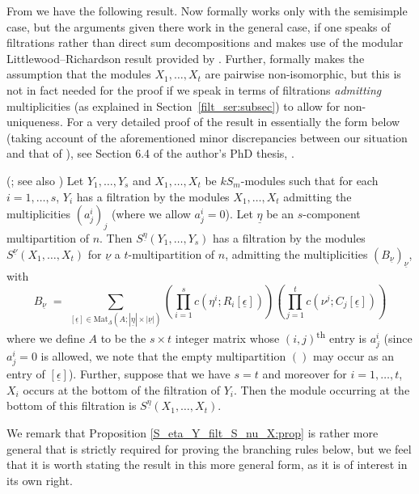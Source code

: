 \documentclass[ALCO,Unicode,published]{cedram}
\newcommand{\tss}[1]{\textsuperscript{#1}}
\newcommand{\ul}[1]{\underline{#1}}
\begin{document}
From \cite{CHTAN} we have the following result. Now \cite{CHTAN} formally works only with the semisimple case, but the arguments given
there work in the general case, if one speaks of filtrations rather than direct sum decompositions and makes use of the  modular
Littlewood--Richardson result provided by \cite{JAMPEEL}. Further, \cite{CHTAN} formally makes the assumption that the modules
$X_1,\ldots,X_t$ are pairwise non-isomorphic, but this is not in fact needed for the proof if we speak in terms of filtrations
\textit{admitting} multiplicities (as explained in Section~\ref{filt_ser:subsec}) to allow for non-uniqueness. For a very detailed proof
of the result in essentially the form below (taking account of the aforementioned minor discrepancies between our situation and that of
\cite{CHTAN}), see Section 6.4 of the author's PhD thesis, \cite{PHDTHES}.

\begin{prop}\label{S_eta_Y_filt_S_nu_X:prop}\textup{(}\cite[Lemma 4.4, (1)]{CHTAN}; see also \cite[Proposition 6.4.1]{PHDTHES}\textup{)}
Let $Y_1,\ldots,Y_s$ and $X_1,\ldots,X_t$ be $kS_m$-modules such that for each $i=1,\ldots,s$, $Y_i$ has a filtration by the modules
$X_1,\ldots,X_t$ admitting the multiplicities $(a^i_j)_j$ (where we allow $a^i_j=0$). Let $\ul{\eta}$ be an $s$-component
multipartition of $n$. Then $S^{\ul{\eta}}(Y_1,\ldots,Y_s)$ has a filtration by the modules $S^{\ul{\nu}}(X_1,\ldots,X_t)$ for $\ul{\nu}$ a
$t$-multipartition of $n$, admitting the multiplicities $\left(B_{\ul{\nu}}\right)_{\ul{\nu}}$, with
\[
B_{\ul{\nu}} \;=\; \sum_{[\ul{\epsilon}] \in \mathrm{Mat}_{\ul{\Lambda}}(A;|\ul{\eta}|\times|\ul{\nu}|)}
\!\!\left(\prod^s_{i=1}c(\eta^i;R_i[\ul{\epsilon}])\right)\!\!\!\left(\prod^t_{j=1}c(\nu^j;C_j[\ul{\epsilon}])\right)
\]
where we define $A$ to be the $s \times t$ integer matrix whose $(i,j)$\tss{th} entry is $a^i_j$ (since $a^i_j=0$ is allowed, we note
that the empty multipartition $()$ may occur as an entry of $[\ul{\epsilon}]$). Further, suppose that we have $s = t$
and moreover for $i=1,\ldots,t$, $X_i$ occurs at the bottom of the filtration of $Y_i$. Then the module occurring at the bottom of this
filtration is $S^{\ul{\eta}}(X_1,\ldots,X_t)$.
\end{prop}

We remark that Proposition \ref{S_eta_Y_filt_S_nu_X:prop} is rather more general that is strictly required for proving the branching
rules below, but we feel that it is worth stating the result in this more general form, as it is of interest in its own right.
\end{document}
